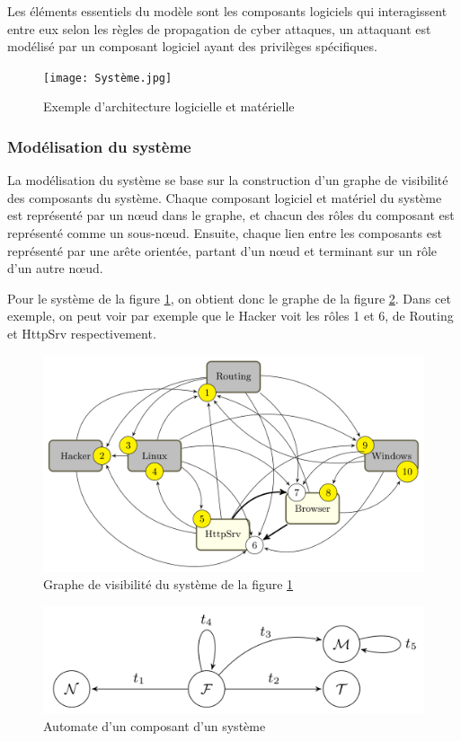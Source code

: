 \documentclass[a4paper]{article}
\begin{document}
    Les éléments essentiels du modèle sont les composants logiciels qui interagissent entre eux selon les règles de propagation de cyber attaques, un attaquant est modélisé par un composant logiciel ayant des privilèges spécifiques.

    \begin{figure}
        \texttt{[image: Système.jpg]}
        \caption{Exemple d'architecture logicielle et matérielle}
        \label{fig:systeme}
    \end{figure}

    \subsubsection{Modélisation du système}

    La modélisation du système se base sur la construction d'un graphe de visibilité des composants du système.
    Chaque composant logiciel et matériel du système est représenté par un n\oe ud dans le graphe, et chacun des rôles du composant est représenté comme un sous-n\oe ud.
    Ensuite, chaque lien entre les composants est représenté par une arête orientée, partant d'un n\oe ud et terminant sur un rôle d'un autre n\oe ud.
    
    Pour le système de la figure \ref{fig:systeme}, on obtient donc le graphe de la figure \ref{fig:graphe}. Dans cet exemple, on peut voir par exemple que le Hacker voit les rôles 1 et 6, de Routing et HttpSrv respectivement.

    \begin{figure}
        \includegraphics[width=\textwidth]{Graphe.png}
        \caption{Graphe de visibilité du système de la figure \ref{fig:systeme}}
        \label{fig:graphe}
    \end{figure}

    \begin{figure}
        \includegraphics[width=\textwidth]{Automate.png}
        \caption{Automate d'un composant d'un système}
        \label{fig:automate}
    \end{figure}
\end{document}
